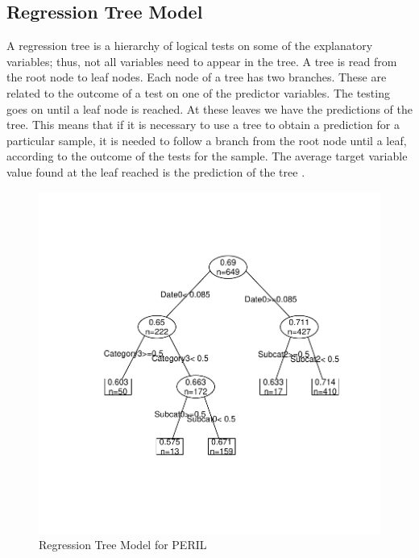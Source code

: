 \subsection{Regression Tree Model}

A regression tree is a hierarchy of logical tests on some of the explanatory variables; thus, not all variables need to appear in the tree. A tree is read from the root node to leaf nodes. Each node of a tree has two branches. These are related to the outcome of a test on one of the predictor variables. The testing goes on until a leaf node is reached. At these leaves we have the predictions of the tree. This means that if it is necessary to use a tree to obtain a prediction for a particular sample, it is needed to follow a branch from the root node until a leaf, according to the outcome of the tests for the sample. The average target variable value found at the leaf reached is the prediction of the tree \cite{torgo2003data}.

\begin{figure}[h]
  \centering
  \includegraphics[width=\columnwidth]{image/regressiontreemodel.pdf}
  \caption{Regression Tree Model for PERIL}
  \label{fig:rtm}
\end{figure}

